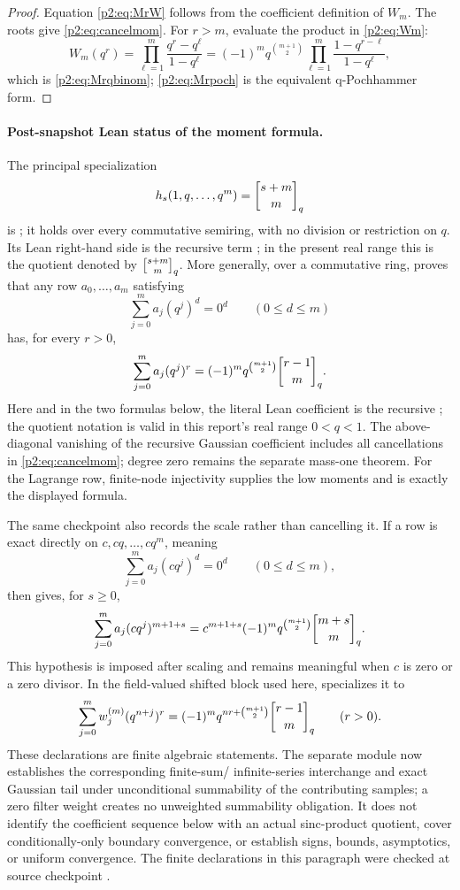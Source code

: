 \documentclass[11pt,oneside]{article}
\numberwithin{equation}{section}
\theoremstyle{definition}
\theoremstyle{remark}
\begin{document}
\begin{proof}
Equation \eqref{p2:eq:MrW} follows from the coefficient definition of \(W_m\).
The roots give \eqref{p2:eq:cancelmom}. For \(r>m\), evaluate the product in
\eqref{p2:eq:Wm}:
\[
 W_m(q^r)=\prod_{\ell=1}^m\frac{q^r-q^\ell}{1-q^\ell}
 =(-1)^m q^{\binom{m+1}{2}}
 \prod_{\ell=1}^m\frac{1-q^{r-\ell}}{1-q^\ell},
\]
which is \eqref{p2:eq:Mrqbinom}; \eqref{p2:eq:Mrpoch} is the equivalent
q-Pochhammer form.
\end{proof}

\paragraph{Post-snapshot Lean status of the moment formula.}
The principal specialization
\[
 h_s(1,q,\ldots,q^m)=\qbinomPartx{s+m}{m}
\]
is ; it holds over every commutative
semiring, with no division or restriction on \(q\).  Its Lean right-hand side
is the recursive term ; in the present
real range this is the quotient denoted by \(\qbinomPartx{s+m}{m}\).  More
generally, over a commutative ring,
 proves that any row
\(a_0,\ldots,a_m\) satisfying
\[
 \sum_{j=0}^{m}a_j(q^j)^d=0^d\qquad(0\le d\le m)
\]
has, for every \(r>0\),
\[
 \sum_{j=0}^{m}a_j(q^j)^r
 =(-1)^m q^{\binom{m+1}{2}}\qbinomPartx{r-1}{m}.
\]
Here and in the two formulas below, the literal Lean coefficient is the
recursive ; the quotient notation is valid in this
report's real range \(0<q<1\).
The above-diagonal vanishing of the recursive Gaussian coefficient includes
all cancellations in \eqref{p2:eq:cancelmom}; degree zero remains the separate
mass-one theorem.  For the Lagrange row, finite-node injectivity supplies the
low moments and  is exactly
the displayed formula.

The same checkpoint also records the scale rather than cancelling it.  If a
row is exact directly on \(c,cq,\ldots,cq^m\), meaning
\[
 \sum_{j=0}^{m}a_j(cq^j)^d=0^d\qquad(0\le d\le m),
\]
then  gives, for \(s\ge0\),
\[
 \sum_{j=0}^{m}a_j(cq^j)^{m+1+s}
 =c^{m+1+s}(-1)^m q^{\binom{m+1}{2}}\qbinomPartx{m+s}{m}.
\]
This hypothesis is imposed after scaling and remains meaningful when \(c\) is
zero or a zero divisor.  In the field-valued shifted block used here,
 specializes it to
\[
 \sum_{j=0}^{m}w_j^{(m)}(q^{n+j})^r
 =(-1)^m q^{nr+\binom{m+1}{2}}\qbinomPartx{r-1}{m}
 \qquad(r>0).
\]
These declarations are finite algebraic statements.  The separate module
 now establishes the corresponding finite-sum/
infinite-series interchange and exact Gaussian tail under unconditional
summability of the contributing samples; a zero filter weight creates no
unweighted summability obligation.  It does not identify the coefficient sequence
below with an actual sinc-product quotient, cover conditionally-only boundary
convergence, or establish signs, bounds, asymptotics, or uniform convergence.
The finite declarations in this paragraph were checked at source checkpoint
.
\end{document}
